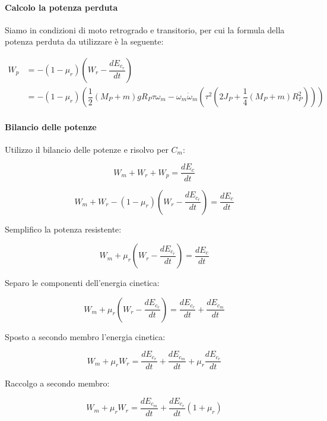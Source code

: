 \documentclass[main.tex]{subfiles}
\begin{document}
\paragraph{Calcolo la potenza perduta} Siamo in condizioni di moto retrogrado e transitorio, per cui la formula della potenza perduta da utilizzare è la seguente:

\begin{align*}
	W_p &= -(1-\mu_r)(W_r - \dfrac{dE_{c_r}}{dt}) \\
	&= -(1-\mu_r)(\dfrac{1}{2}(M_P + m)gR_P\tau\omega_m - \omega_m\dot{\omega}_m(\tau^2(2J_P + \dfrac{1}{4}(M_P + m)R_P^2)))
\end{align*}

\paragraph{Bilancio delle potenze} Utilizzo il bilancio delle potenze e risolvo per $C_m$:

\begin{equation}
	W_m + W_r + W_p = \dfrac{dE_c}{dt}
\end{equation}

\begin{equation}
	W_m + W_r -(1-\mu_r)(W_r - \dfrac{dE_{c_r}}{dt}) = \dfrac{dE_c}{dt}
\end{equation}

Semplifico la potenza resistente:

\begin{equation}
	W_m + \mu_r(W_r - \dfrac{dE_{c_r}}{dt}) = \dfrac{dE_c}{dt}
\end{equation}

Separo le componenti dell'energia cinetica:

\begin{equation}
	W_m + \mu_r(W_r - \dfrac{dE_{c_r}}{dt}) = \dfrac{dE_{c_r}}{dt} + \dfrac{dE_{c_m}}{dt}
\end{equation}

Sposto a secondo membro l'energia cinetica:

\begin{equation}
	W_m + \mu_rW_r = \dfrac{dE_{c_r}}{dt} + \dfrac{dE_{c_m}}{dt} + \mu_r\dfrac{dE_{c_r}}{dt}
\end{equation}

Raccolgo a secondo membro:

\begin{equation}
	W_m + \mu_rW_r = \dfrac{dE_{c_m}}{dt} + \dfrac{dE_{c_r}}{dt}(1+\mu_r)
\end{equation}
\end{document}
